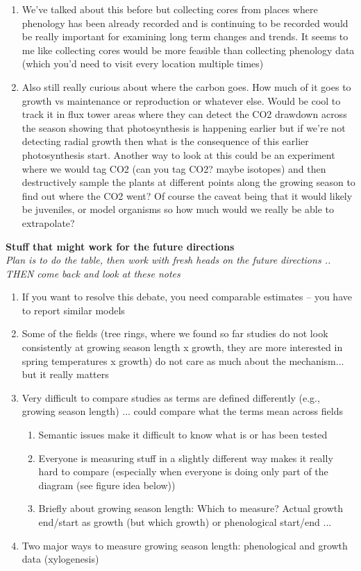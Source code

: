 \documentclass[11pt,letter]{article}
\begin{document}
\begin{enumerate}
\item We’ve talked about this before but collecting cores from places where phenology has been already recorded and is continuing to be recorded would be really important for examining long term changes and trends. It seems to me like collecting cores would be more feasible than collecting phenology data (which you’d need to visit every location multiple times)
\item Also still really curious about where the carbon goes. How much of it goes to growth vs maintenance or reproduction or whatever else. Would be cool to track it in flux tower areas where they can detect the CO2 drawdown across the season showing that photosynthesis is happening earlier but if we’re not detecting radial growth then what is the consequence of this earlier photosynthesis start. Another way to look at this could be an experiment where we would tag CO2 (can you tag CO2? maybe isotopes) and then destructively sample the plants at different points along the growing season to find out where the CO2 went? Of course the caveat being that it would likely be juveniles, or model organisms so how much would we really be able to extrapolate?
\end{enumerate}

\newpage
{\bf Stuff that might work for the future directions}\\
\emph{Plan is to do the table, then work with fresh heads on the future directions .. THEN come back and look at these notes}
\begin{enumerate}
\item If you want to resolve this debate, you need comparable estimates -- you have to report similar models %
\item Some of the fields (tree rings, where we found so far studies do not look consistently at growing season length x growth, they are more interested in spring temperatures x growth) do not care as much about the mechanism... but it really matters
\item Very difficult to compare studies as terms are defined differently (e.g., growing season length) ... could compare what the terms mean across fields
\begin{enumerate}
\item Semantic issues make it difficult to know what is or has been tested
\item Everyone is measuring stuff in a slightly different way makes it really hard to compare (especially when everyone is doing only part of the diagram (see figure idea below))
\item Briefly about growing season length: Which to measure? Actual growth end/start as growth (but which growth) or phenological start/end ... 
\end{enumerate}
\item Two major ways to measure growing season length: phenological and growth data (xylogenesis)
\end{enumerate}
\end{document}
